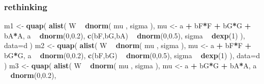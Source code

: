 \documentclass[
]{article}
\newenvironment{Shaded}{\begin{snugshade}}{\end{snugshade}}
\newcommand{\DataTypeTok}[1]{\textcolor[rgb]{0.13,0.29,0.53}{#1}}
\newcommand{\DecValTok}[1]{\textcolor[rgb]{0.00,0.00,0.81}{#1}}
\newcommand{\FloatTok}[1]{\textcolor[rgb]{0.00,0.00,0.81}{#1}}
\newcommand{\KeywordTok}[1]{\textcolor[rgb]{0.13,0.29,0.53}{\textbf{#1}}}
\newcommand{\NormalTok}[1]{#1}
\newcommand{\OperatorTok}[1]{\textcolor[rgb]{0.81,0.36,0.00}{\textbf{#1}}}
\newcommand{\StringTok}[1]{\textcolor[rgb]{0.31,0.60,0.02}{#1}}
\begin{document}
\hypertarget{rethinking-2}{%
\subsubsection{rethinking}\label{rethinking-2}}

\begin{Shaded}
\begin{Highlighting}[]
\NormalTok{m1 <-}\StringTok{ }\KeywordTok{quap}\NormalTok{(}
    \KeywordTok{alist}\NormalTok{(}
\NormalTok{        W }\OperatorTok{~}\StringTok{ }\KeywordTok{dnorm}\NormalTok{( mu , sigma ),}
\NormalTok{        mu <-}\StringTok{ }\NormalTok{a }\OperatorTok{+}\StringTok{ }\NormalTok{bF}\OperatorTok{*}\NormalTok{F }\OperatorTok{+}\StringTok{ }\NormalTok{bG}\OperatorTok{*}\NormalTok{G }\OperatorTok{+}\StringTok{ }\NormalTok{bA}\OperatorTok{*}\NormalTok{A,}
\NormalTok{        a }\OperatorTok{~}\StringTok{ }\KeywordTok{dnorm}\NormalTok{(}\DecValTok{0}\NormalTok{,}\FloatTok{0.2}\NormalTok{),}
        \KeywordTok{c}\NormalTok{(bF,bG,bA) }\OperatorTok{~}\StringTok{ }\KeywordTok{dnorm}\NormalTok{(}\DecValTok{0}\NormalTok{,}\FloatTok{0.5}\NormalTok{),}
\NormalTok{        sigma }\OperatorTok{~}\StringTok{ }\KeywordTok{dexp}\NormalTok{(}\DecValTok{1}\NormalTok{)}
\NormalTok{    ), }\DataTypeTok{data=}\NormalTok{d )}
\NormalTok{m2 <-}\StringTok{ }\KeywordTok{quap}\NormalTok{(}
    \KeywordTok{alist}\NormalTok{(}
\NormalTok{        W }\OperatorTok{~}\StringTok{ }\KeywordTok{dnorm}\NormalTok{( mu , sigma ),}
\NormalTok{        mu <-}\StringTok{ }\NormalTok{a }\OperatorTok{+}\StringTok{ }\NormalTok{bF}\OperatorTok{*}\NormalTok{F }\OperatorTok{+}\StringTok{ }\NormalTok{bG}\OperatorTok{*}\NormalTok{G,}
\NormalTok{        a }\OperatorTok{~}\StringTok{ }\KeywordTok{dnorm}\NormalTok{(}\DecValTok{0}\NormalTok{,}\FloatTok{0.2}\NormalTok{),}
        \KeywordTok{c}\NormalTok{(bF,bG) }\OperatorTok{~}\StringTok{ }\KeywordTok{dnorm}\NormalTok{(}\DecValTok{0}\NormalTok{,}\FloatTok{0.5}\NormalTok{),}
\NormalTok{        sigma }\OperatorTok{~}\StringTok{ }\KeywordTok{dexp}\NormalTok{(}\DecValTok{1}\NormalTok{)}
\NormalTok{    ), }\DataTypeTok{data=}\NormalTok{d )}
\NormalTok{m3 <-}\StringTok{ }\KeywordTok{quap}\NormalTok{(}
    \KeywordTok{alist}\NormalTok{(}
\NormalTok{        W }\OperatorTok{~}\StringTok{ }\KeywordTok{dnorm}\NormalTok{( mu , sigma ),}
\NormalTok{        mu <-}\StringTok{ }\NormalTok{a }\OperatorTok{+}\StringTok{ }\NormalTok{bG}\OperatorTok{*}\NormalTok{G }\OperatorTok{+}\StringTok{ }\NormalTok{bA}\OperatorTok{*}\NormalTok{A,}
\NormalTok{        a }\OperatorTok{~}\StringTok{ }\KeywordTok{dnorm}\NormalTok{(}\DecValTok{0}\NormalTok{,}\FloatTok{0.2}\NormalTok{),}

\end{Highlighting}
\end{Shaded}
\end{document}

